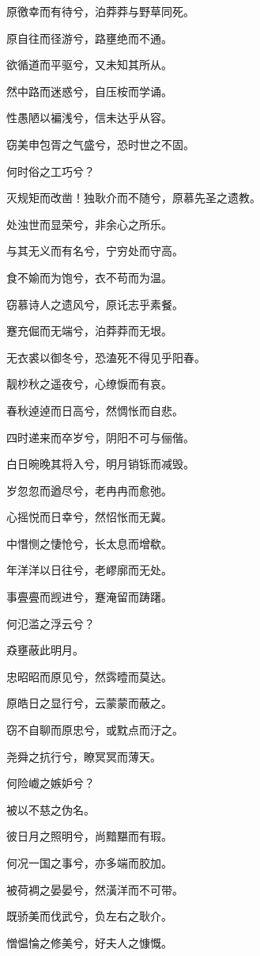 \documentclass[12pt,a4paper]{ctexbook}
\begin{document}
原徼幸而有待兮，泊莽莽与野草同死。\par
原自往而径游兮，路壅绝而不通。\par
欲循道而平驱兮，又未知其所从。\par
然中路而迷惑兮，自压桉而学诵。\par
性愚陋以褊浅兮，信未达乎从容。\par
窃美申包胥之气盛兮，恐时世之不固。\par
何时俗之工巧兮？\par
灭规矩而改凿！独耿介而不随兮，原慕先圣之遗教。\par
处浊世而显荣兮，非余心之所乐。\par
与其无义而有名兮，宁穷处而守高。\par
食不媮而为饱兮，衣不苟而为温。\par
窃慕诗人之遗风兮，原讬志乎素餐。\par
蹇充倔而无端兮，泊莽莽而无垠。\par
无衣裘以御冬兮，恐溘死不得见乎阳春。\par
靓杪秋之遥夜兮，心缭悷而有哀。\par
春秋逴逴而日高兮，然惆怅而自悲。\par
四时递来而卒岁兮，阴阳不可与俪偕。\par
白日晼晚其将入兮，明月销铄而减毁。\par
岁忽忽而遒尽兮，老冉冉而愈弛。\par
心摇悦而日幸兮，然怊怅而无冀。\par
中憯恻之悽怆兮，长太息而增欷。\par
年洋洋以日往兮，老嵺廓而无处。\par
事亹亹而觊进兮，蹇淹留而踌躇。\par
何氾滥之浮云兮？\par
猋壅蔽此明月。\par
忠昭昭而原见兮，然霠曀而莫达。\par
原皓日之显行兮，云蒙蒙而蔽之。\par
窃不自聊而原忠兮，或黕点而汙之。\par
尧舜之抗行兮，瞭冥冥而薄天。\par
何险巇之嫉妒兮？\par
被以不慈之伪名。\par
彼日月之照明兮，尚黯黮而有瑕。\par
何况一国之事兮，亦多端而胶加。\par
被荷裯之晏晏兮，然潢洋而不可带。\par
既骄美而伐武兮，负左右之耿介。\par
憎愠惀之修美兮，好夫人之慷慨。\par
\end{document}
